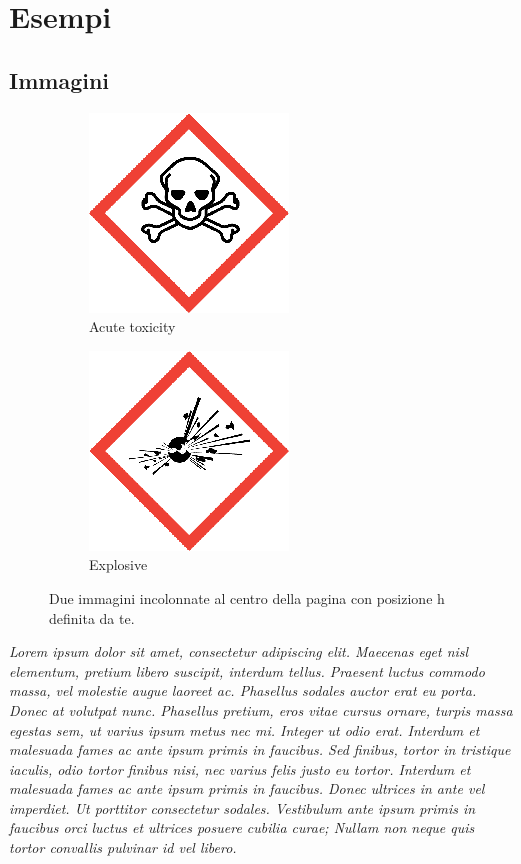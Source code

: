 \newpage
\section*{Esempi}
\subsection*{Immagini}

\begin{figure}[h]
    \centering
    \begin{subfigure}[]{0.5\linewidth}
    \centering
    \includegraphics[scale=0.2]{img/pittogrammi/Acute toxicity.png}
    \caption{Acute toxicity}
    \end{subfigure}
    \begin{subfigure}[]{0.5\linewidth}
    \centering
    \includegraphics[scale=0.2]{img/pittogrammi/Explosive.png}
    \caption{Explosive}
    \end{subfigure}
    \caption{Due immagini incolonnate al centro della pagina con posizione h definita da te.}
    \label{fig:1}
\end{figure}

\textit{Lorem ipsum dolor sit amet, consectetur adipiscing elit. Maecenas eget nisl elementum, pretium libero suscipit, interdum tellus. Praesent luctus commodo massa, vel molestie augue laoreet ac. Phasellus sodales auctor erat eu porta. Donec at volutpat nunc. Phasellus pretium, eros vitae cursus ornare, turpis massa egestas sem, ut varius ipsum metus nec mi. Integer ut odio erat. Interdum et malesuada fames ac ante ipsum primis in faucibus. Sed finibus, tortor in tristique iaculis, odio tortor finibus nisi, nec varius felis justo eu tortor. Interdum et malesuada fames ac ante ipsum primis in faucibus. Donec ultrices in ante vel imperdiet. Ut porttitor consectetur sodales. Vestibulum ante ipsum primis in faucibus orci luctus et ultrices posuere cubilia curae; Nullam non neque quis tortor convallis pulvinar id vel libero.}

